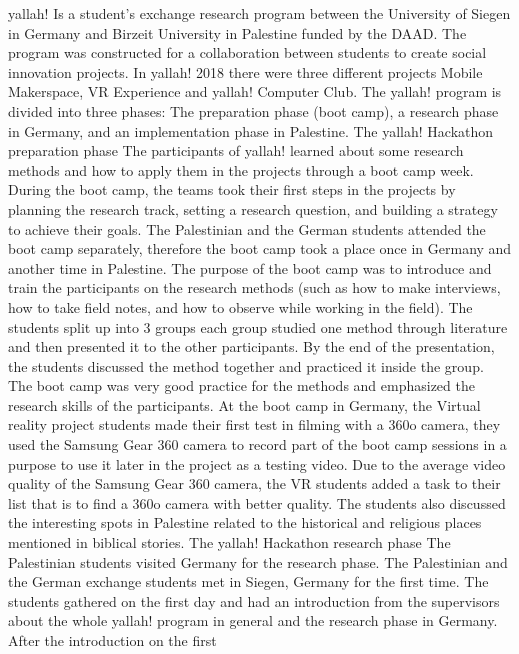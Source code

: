 \acrshort{yallah!} Is a student’s exchange research program between the University of Siegen in
Germany and Birzeit University in Palestine funded by the DAAD. The program was
constructed for a collaboration between students to create social innovation projects.
In \acrshort{yallah!} 2018 there were three different projects Mobile Makerspace, VR Experience and
\acrshort{yallah!} Computer Club. The \acrshort{yallah!} program is divided into three phases: The preparation
phase (boot camp), a research phase in Germany, and an implementation phase in Palestine.
The \acrshort{yallah!} Hackathon preparation phase
The participants of \acrshort{yallah!} learned about some research methods and how to apply them in
the projects through a boot camp week. During the boot camp, the teams took their first
steps in the projects by planning the research track, setting a research question, and building
a strategy to achieve their goals.
The Palestinian and the German students attended the boot camp separately, therefore the
boot camp took a place once in Germany and another time in Palestine. The purpose of the
boot camp was to introduce and train the participants on the research methods (such as how
to make interviews, how to take field notes, and how to observe while working in the field).
The students split up into 3 groups each group studied one method through literature and
then presented it to the other participants. By the end of the presentation, the students
discussed the method together and practiced it inside the group. The boot camp was very
good practice for the methods and emphasized the research skills of the participants. At the
boot camp in Germany, the Virtual reality project students made their first test in filming with
a 360o camera, they used the Samsung Gear 360 camera to record part of the boot camp
sessions in a purpose to use it later in the project as a testing video. Due to the average video
quality of the Samsung Gear 360 camera, the VR students added a task to their list that is to
find a 360o camera with better quality. The students also discussed the interesting spots in
Palestine related to the historical and religious places mentioned in biblical stories.
The \acrshort{yallah!} Hackathon research phase
The Palestinian students visited Germany for the research phase. The Palestinian and the
German exchange students met in Siegen, Germany for the first time. The students gathered
on the first day and had an introduction from the supervisors about the whole \acrshort{yallah!}
program in general and the research phase in Germany. After the introduction on the first
